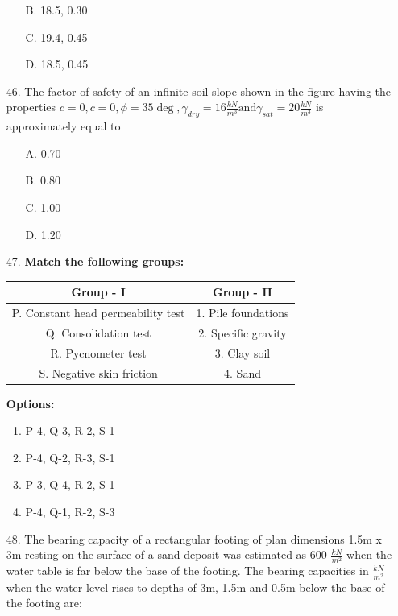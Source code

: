 \documentclass[journal]{IEEEtran}
\begin{document}
\begin{enumerate}
\begin{enumerate}
    \item [B.] 18.5, 0.30
    \item [C.] 19.4, 0.45
    \item [D.] 18.5, 0.45
  \end{enumerate}
  \item [46.] The factor of safety of an infinite soil slope shown in the figure having the
  properties $c=0, c=0,\phi=35\deg,\gamma_{dry}=16\frac{kN}{m^3} \text{and} \gamma_{sat}=20\frac{kN}{m^3}$ is
  approximately equal to
  \begin{figure}[!ht]
    \centering
    \caption{ }
    \label{fig:6}
  \end{figure}
  \begin{enumerate}
    \item [A.] 0.70
    \item [B.] 0.80
    \item [C.] 1.00
    \item [D.] 1.20
  \end{enumerate} 
  
  \item [47.] \textbf{Match the following groups:}

  \begin{center}
  \begin{tabular}{|c c|}
  \hline
  \textbf{Group - I} & \textbf{Group - II} \\
  \hline
  P. Constant head permeability test & 1. Pile foundations \\
  Q. Consolidation test               & 2. Specific gravity \\
  R. Pycnometer test                  & 3. Clay soil \\
  S. Negative skin friction            & 4. Sand \\
  \hline
  \end{tabular}
  \end{center}
  
  \textbf{Options:}
  
  \begin{enumerate}[label=\Alph*]
      \item P-4, Q-3, R-2, S-1
      \item P-4, Q-2, R-3, S-1
      \item P-3, Q-4, R-2, S-1
      \item P-4, Q-1, R-2, S-3
  \end{enumerate}
  \item [48.] The bearing capacity of a rectangular footing of plan dimensions 1.5m x 3m resting on the surface of a sand deposit was estimated as 600 $\frac{kN}{m^2}$ when the water table is far below the base of the footing. The bearing capacities in $\frac{kN}{m^2}$ when the water level rises to depths of 3m, 1.5m and 0.5m below the base of the footing are:


\end{enumerate}
\end{document}
